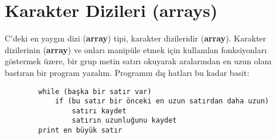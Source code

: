 \documentclass[a4paper,12pt,oneside]{book}
\begin{document}
\section{Karakter Dizileri (arrays)}

C'deki en yaygın dizi (\textbf{array}) tipi, karakter dizileridir (\textbf{array}). Karakter dizilerinin (\textbf{array}) ve onları manipüle etmek için kullanılan fonksiyonları göstermek üzere, bir grup metin satırı okuyarak aralarından en uzun olanı bastıran bir program yazalım. Programın dış hatları bu kadar basit:
\begin{lstlisting}
		while (başka bir satır var)
			if (bu satır bir önceki en uzun satırdan daha uzun)
				satırı kaydet
				satırın uzunluğunu kaydet
		print en büyük satır
\end{lstlisting} \pagebreak
\end{document}
